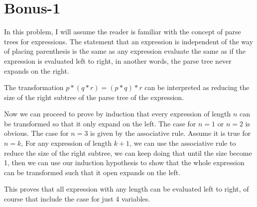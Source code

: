 \section*{Bonus-1}
In this problem, I will assume the reader is familiar with the concept of parse trees for expressions. The statement that an expression is independent of the way of placing parenthesis is the same as any expression evaluate the same as if the expression is evaluated left to right, in another words, the parse tree never expands on the right.

The transformation $ p * (q * r) = (p * q) * r $ can be interpreted as reducing the size of the right subtree of the parse tree of the expression.

Now we can proceed to prove by induction that every expression of length $ n $ can be transformed so that it only expand on the left. The case for $ n = 1 $ or $ n = 2 $ is obvious. The case for $ n = 3 $ is given by the associative rule. Assume it is true for $ n = k $, For any expression of length $ k + 1 $, we can use the associative rule to reduce the size of the right subtree, we can keep doing that until the size become 1, then we can use our induction hypothesis to show that the whole expression can be transformed such that it open expands on the left.

This proves that all expression with any length can be evaluated left to right, of course that include the case for just 4 variables.


